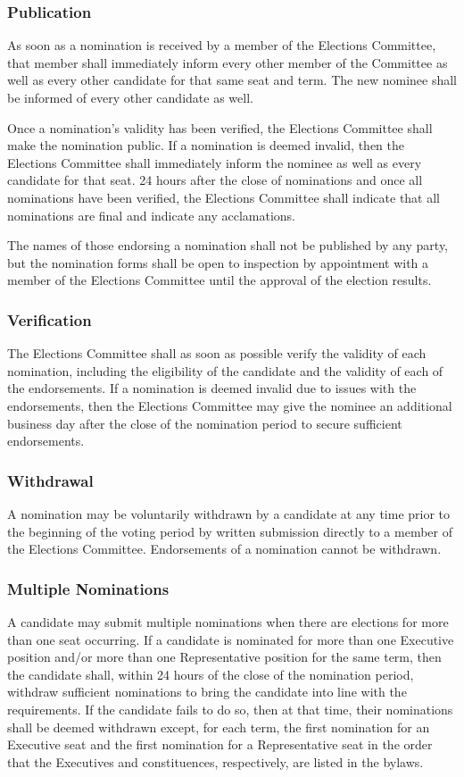 \subsubsection{Publication}
As soon as a nomination is received by a member of the Elections Committee, that
member shall immediately inform every other member of the Committee as well as
every other candidate for that same seat and term. The new nominee shall be
informed of every other candidate as well.

Once a nomination's validity has been verified, the Elections Committee shall
make the nomination public. If a nomination is deemed invalid, then the
Elections Committee shall immediately inform the nominee as well as every
candidate for that seat. 24 hours after the close of nominations and once all
nominations have been verified, the Elections Committee shall indicate that all
nominations are final and indicate any acclamations.

The names of those endorsing a nomination shall not be published by any party,
but the nomination forms shall be open to inspection by appointment with a
member of the Elections Committee until the approval of the election results.

\subsubsection{Verification}
The Elections Committee shall as soon as possible verify the validity of each
nomination, including the eligibility of the candidate and the validity of each
of the endorsements. If a nomination is deemed invalid due to issues with the
endorsements, then the Elections Committee may give the nominee an additional
business day after the close of the nomination period to secure sufficient
endorsements.

\subsubsection{Withdrawal}
A nomination may be voluntarily withdrawn by a candidate at any time prior to
the beginning of the voting period by written submission directly to a member of
the Elections Committee. Endorsements of a nomination cannot be withdrawn.

\subsubsection{Multiple Nominations}
A candidate may submit multiple nominations when there are elections for more than
one seat occurring. If a candidate is nominated for more than one Executive
position and/or more than one Representative position for the same term, then
the candidate shall, within 24 hours of the close of the nomination period,
withdraw sufficient nominations to bring the candidate into line with the
requirements. If the candidate fails to do so, then at that time, their
nominations shall be deemed withdrawn except, for each term, the first
nomination for an Executive seat and the first nomination for a Representative
seat in the order that the Executives and constituences, respectively, are
listed in the bylaws.


